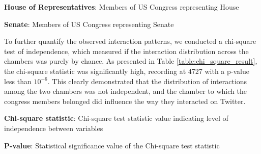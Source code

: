 \documentclass[11pt]{article}
\begin{document}
\begin{table}[h]
\caption{Distribution of interactions among House of Representatives and Senate Members}
\label{table:distribution_of_interactions}
\begin{threeparttable}
\renewcommand{\TPTminimum}{\linewidth}
\begin{tablenotes}
\footnotesize
\item \textbf{House of Representatives}: Members of US Congress representing House
\item \textbf{Senate}: Members of US Congress representing Senate
\end{tablenotes}
\end{threeparttable}
\end{table}


To further quantify the observed interaction patterns, we conducted a chi-square test of independence, which measured if the interaction distribution across the chambers was purely by chance. As presented in Table {}\ref{table:chi_square_result}, the chi-square statistic was significantly high, recording at 4727 with a p-value less than $10^{-6}$. This clearly demonstrated that the distribution of interactions among the two chambers was not independent, and the chamber to which the congress members belonged did influence the way they interacted on Twitter.

\begin{table}[h]
\caption{Chi-square Test of Independence Result}
\label{table:chi_square_result}
\begin{threeparttable}
\renewcommand{\TPTminimum}{\linewidth}
\begin{tablenotes}
\footnotesize
\item \textbf{Chi-square statistic}: Chi-square test statistic value indicating level of independence between variables
\item \textbf{P-value}: Statistical significance value of the Chi-square test statistic
\end{tablenotes}
\end{threeparttable}
\end{table}
\end{document}
